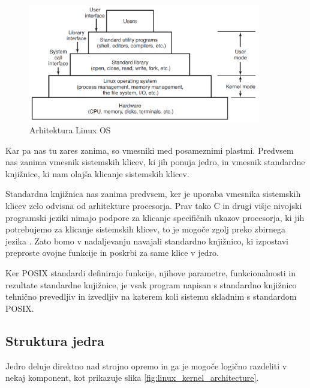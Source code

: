 \documentclass[a4paper,12pt,openright]{book}
\begin{document}
\begin{figure}[h!]
	\begin{center}
		\includegraphics[width=0.9\textwidth]{images/linux_layers.png}
	\end{center}
	\caption{Arhitektura Linux OS \cite{Tanenbaum_Bos_2023}}
	\label{fig:linux_architecture}
\end{figure}

Kar pa nas tu zares zanima, so vmesniki med posameznimi plastmi.
Predvsem nas zanima vmesnik sistemskih klicev, ki jih ponuja jedro, in vmesnik standardne knjižnice, ki nam olajša klicanje sistemskih klicev.

Standardna knjižnica nas zanima predvsem, ker je uporaba vmesnika sistemskih klicev zelo odvisna od arhitekture procesorja.
Prav tako C in drugi višje nivojski programski jeziki nimajo podpore za klicanje specifičnih ukazov procesorja, ki jih potrebujemo za klicanje sistemskih klicev, to je mogoče zgolj preko zbirnega jezika \cite{Tanenbaum_Bos_2023}.
Zato bomo v nadaljevanju navajali standardno knjižnico, ki izpostavi preproste ovojne funkcije in poskrbi za same klice v jedro.

Ker POSIX standardi definirajo funkcije, njihove parametre, funkcionalnosti in rezultate standardne knjižnice, je vsak program napisan s standardno knjižnico tehnično prevedljiv in izvedljiv na katerem koli sistemu skladnim s standardom POSIX.

\subsection{Struktura jedra}

Jedro deluje direktno nad strojno opremo in ga je mogoče logično razdeliti v nekaj komponent, kot prikazuje slika \ref{fig:linux_kernel_architecture}.
\end{document}
